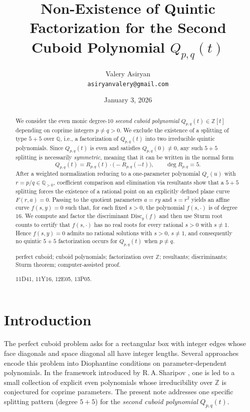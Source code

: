 \documentclass[12pt]{article}
\title{Non-Existence of Quintic Factorization for the Second Cuboid Polynomial $Q_{p,q}(t)$}
\author{Valery Asiryan\\[3pt]
\small \texttt{asiryanvalery@gmail.com}}
\date{\small January 3, 2026}
\theoremstyle{remark}
\theoremstyle{definition}
\begin{document}
\maketitle

\begin{abstract}
We consider the even monic degree-$10$ \emph{second cuboid polynomial} $Q_{p,q}(t)\in\mathbb{Z}[t]$ depending on coprime integers $p\neq q>0$.
We exclude the existence of a splitting of type $5+5$ over $\mathbb{Q}$, i.e., a factorization of $Q_{p,q}(t)$ into two irreducible quintic polynomials.
Since $Q_{p,q}(t)$ is even and satisfies $Q_{p,q}(0)\neq 0$, any such $5+5$ splitting is necessarily \emph{symmetric}, meaning that it can be written in the normal form
\[
Q_{p,q}(t)=R_{p,q}(t)\cdot \bigl(-R_{p,q}(-t)\bigr),\qquad \deg R_{p,q}=5.
\]
After a weighted normalization reducing to a one-parameter polynomial $Q_r(u)$ with $r=p/q\in\mathbb{Q}_{>0}$, coefficient comparison and elimination via resultants show that a $5+5$ splitting forces the existence of a rational point on an explicitly defined plane curve $F(r,a)=0$.
Passing to the quotient parameters $a=r y$ and $s=r^2$ yields an affine curve $f(s,y)=0$ such that, for each fixed $s>0$, the polynomial $f(s,\cdot)$ is of degree $16$.
We compute and factor the discriminant $\mathrm{Disc}_y(f)$ and then use Sturm root counts to certify that $f(s,\cdot)$ has no real roots for every rational $s>0$ with $s\neq 1$.
Hence $f(s,y)=0$ admits no rational solutions with $s>0$, $s\neq 1$, and consequently no quintic $5+5$ factorization occurs for $Q_{p,q}(t)$ when $p\neq q$.

\medskip
{}
perfect cuboid; cuboid polynomials; factorization over $\mathbb{Z}$; resultants; discriminants; Sturm theorem; computer-assisted proof.

\smallskip
{} 11D41, 11Y16, 12E05, 13P05.
\end{abstract}


\section{Introduction}\label{sec:intro}
The perfect cuboid problem asks for a rectangular box with integer edges whose face diagonals and space diagonal all have integer lengths.
Several approaches encode this problem into Diophantine conditions on parameter-dependent polynomials.
In the framework introduced by R.\,A.\,Sharipov \cite{Sharipov2011Cuboids,Sharipov2011Note}, one is led to a small collection of explicit even polynomials whose irreducibility over $\mathbb{Z}$ is conjectured for coprime parameters.
The present note addresses one specific splitting pattern (degree $5+5$) for the \emph{second cuboid polynomial} $Q_{p,q}(t)$.
\end{document}
